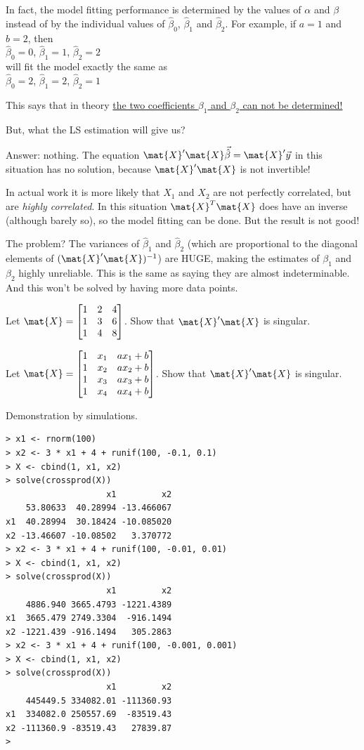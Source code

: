 \documentclass[12pt]{article}
\begin{document}
In fact, the model fitting performance is determined by
the values of $\alpha$ and $\beta$
instead of by the individual values of
$\hat\beta_0$, $\hat\beta_1$ and $\hat\beta_2$.
For example,
if $a = 1$ and $b = 2$, then\\
$\hat\beta_0 = 0$,
$\hat\beta_1 = 1$,
$\hat\beta_2 = 2$\\
will fit the model exactly the same as\\
$\hat\beta_0 = 2$,
$\hat\beta_1 = 2$,
$\hat\beta_2 = 1$


This says that in theory
\underline{the two coefficients $\beta_1$ and $\beta_2$
can not be determined!}

But, what the LS estimation will give us?

Answer: nothing.
The equation $\mat{X}'\mat{X}\vec{\hat\beta} = \mat{X}'\vec{y}$ in this
situation has no solution, because $\mat{X}'\mat{X}$ is not invertible!

In actual work it is more likely that $X_1$ and $X_2$ are not perfectly
correlated, but are \emph{highly correlated}.
In this situation $\mat{X}^T\mat{X}$ does have an inverse
(although barely so), so the model fitting can be done.
But the result is not good!

The problem?
The variances of $\hat\beta_1$ and $\hat\beta_2$
(which are proportional to the diagonal elements
of $(\mat{X}'\mat{X})^{-1}$)
are HUGE, making the estimates of $\beta_1$ and $\beta_2$
highly unreliable.
This is the same as saying they are almost indeterminable.
And this won't be solved by having more data points.


\exercise
Let $\mat{X} = \begin{bmatrix}1 & 2 & 4\\ 1 & 3 & 6\\ 1 & 4 & 8\end{bmatrix}$.
Show that $\mat{X}'\mat{X}$ is singular.

\exercise
Let
$\mat{X} = \begin{bmatrix}
    1 & x_1 & ax_1 + b\\
    1 & x_2 & ax_2 + b\\
    1 & x_3 & ax_3 + b\\
    1 & x_4 & ax_4 + b
    \end{bmatrix}$.
Show that $\mat{X}'\mat{X}$ is singular.

\example Demonstration by simulations.
\begin{verbatim}
> x1 <- rnorm(100)
> x2 <- 3 * x1 + 4 + runif(100, -0.1, 0.1)
> X <- cbind(1, x1, x2)
> solve(crossprod(X))
                    x1         x2
    53.80633  40.28994 -13.466067
x1  40.28994  30.18424 -10.085020
x2 -13.46607 -10.08502   3.370772
> x2 <- 3 * x1 + 4 + runif(100, -0.01, 0.01)
> X <- cbind(1, x1, x2)
> solve(crossprod(X))
                    x1         x2
    4886.940 3665.4793 -1221.4389
x1  3665.479 2749.3304  -916.1494
x2 -1221.439 -916.1494   305.2863
> x2 <- 3 * x1 + 4 + runif(100, -0.001, 0.001)
> X <- cbind(1, x1, x2)
> solve(crossprod(X))
                    x1         x2
    445449.5 334082.01 -111360.93
x1  334082.0 250557.69  -83519.43
x2 -111360.9 -83519.43   27839.87
> 
\end{verbatim}
\end{document}

